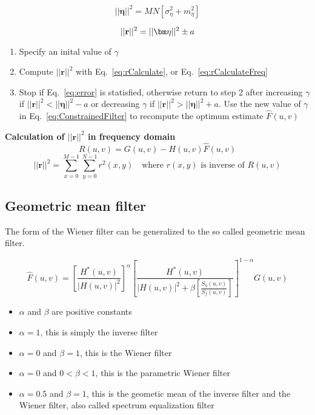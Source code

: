 \begin{equation}
	||\bm\eta||^2= MN[\sigma_{\eta}^2 + m_{\eta}^2]	
\end{equation}

\begin{equation}
	||\mathbf{r}||^2 = ||\bm\eta||^2 \pm a
	\label{eq:error}\\
\end{equation}
\begin{enumerate}
	\item Specify an inital value of $\gamma$
	\item Compute $||\mathbf{r}||^2$ with Eq.~\ref{eq:rCalculate}, or  Eq.~\ref{eq:rCalculateFreq}
	\item Stop if Eq.~\ref{eq:error} is statisfied, otherwise return to step 2 after increasing $\gamma$ if $||\mathbf{r}||^2 < ||\bm\eta||^2-a$ or  decreasing $\gamma$ if  $||\mathbf{r}||^2 > ||\bm\eta||^2+a$. Use the new value of $\gamma$ in Eq.~\ref{eq:ConstrainedFilter} to recompute the optimum estimate $\hat{F}(u,v)$
\end{enumerate}

\textbf{Calculation of $||\mathbf{r}||^2$ in frequency domain}
	\begin{equation}
		R(u,v) = G(u,v) - H(u,v)\hat{F}(u,v)
	\end{equation}
	\begin{equation}
		||\mathbf{r}||^2 = \sum\limits_{x=0}^{M-1} \sum\limits_{y=0}^{N-1} r^{2}(x,y) \quad \textrm{where } r(x,y) \textrm{ is inverse of } R(u,v) 
		\label{eq:rCalculateFreq}
	\end{equation}

\subsection{Geometric mean filter }
The form of the Wiener filter can be generalized to the so called geometric mean filter.

\begin{equation}
	\hat{F}(u,v) =  \left[ \frac{H^*(u,v)}{|H(u,v)|^2} \right]^{\alpha}  \left[ \frac{H^*(u,v)}{|H(u,v)|^2 + \beta \left[ \frac{S_\eta(u,v)}{S_f(u,v)}\right]} \right]^{1-\alpha} G(u,v)
\end{equation}

\begin{itemize}
	\item $\alpha$ and $\beta$ are positive constants
	\item $\alpha = 1$, this is simply the inverse filter
	\item $\alpha=0$ and $\beta=1$, this is the Wiener filter
	\item $\alpha=0$ and $0 < \beta < 1$, this is the parametric Wiener filter
	\item $\alpha=0.5$ and $\beta=1$, this is the geometic mean of the inverse filter and the Wiener filter, also called spectrum equalization filter
\end{itemize}

